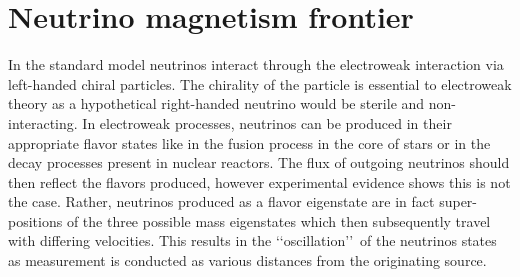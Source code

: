 \chapter{Neutrino magnetism frontier}
\noindent In the standard model neutrinos interact through the electroweak interaction via left-handed chiral particles. The chirality of the particle is essential to electroweak theory as a hypothetical right-handed neutrino would be sterile and non-interacting. In electroweak processes, neutrinos can be produced in their appropriate flavor states like in the fusion process in the core of stars or in the decay processes present in nuclear reactors. The flux of outgoing neutrinos should then reflect the flavors produced, however experimental evidence shows this is not the case. Rather, neutrinos produced as a flavor eigenstate are in fact super-positions of the three possible mass eigenstates which then subsequently travel with differing velocities. This results in the \lq\lq oscillation\rq\rq\ of the neutrinos states as measurement is conducted as various distances from the originating source.

